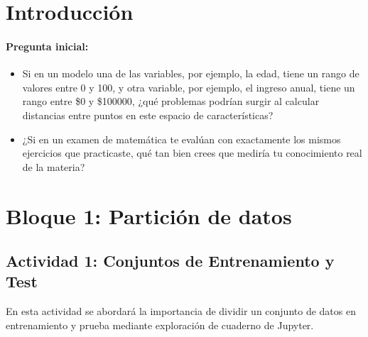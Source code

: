 \documentclass[a4,11pt]{aleph-notas}
\begin{document}
\section*{Introducción}

\paragraph{Pregunta inicial:}
\begin{itemize}
    \item
    Si en un modelo una de las variables, por ejemplo, la edad, tiene un rango de valores entre 0 y 100, y otra variable, por ejemplo, el ingreso anual, tiene un rango entre \$0 y \$100000, ¿qué problemas podrían surgir al calcular distancias entre puntos en este espacio de características?
    \item
    ¿Si en un examen de matemática te evalúan con exactamente los mismos ejercicios que practicaste, qué tan bien crees que mediría tu conocimiento real de la materia?
\end{itemize}

\section*{Bloque 1: Partición de datos}
\subsection*{Actividad 1: Conjuntos de Entrenamiento y Test}

En esta actividad se abordará la importancia de dividir un conjunto de datos en entrenamiento y prueba mediante exploración de cuaderno de Jupyter.
\end{document}
